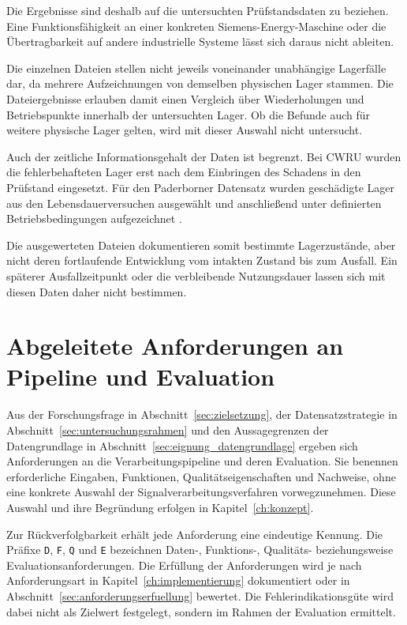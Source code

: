 Die Ergebnisse sind deshalb auf die untersuchten Prüfstandsdaten zu beziehen.
Eine Funktionsfähigkeit an einer konkreten Siemens-Energy-Maschine oder die
Übertragbarkeit auf andere industrielle Systeme lässt sich daraus nicht
ableiten.

Die einzelnen Dateien stellen nicht jeweils voneinander unabhängige
Lagerfälle dar, da mehrere Aufzeichnungen von demselben physischen Lager
stammen. Die Dateiergebnisse erlauben damit einen Vergleich über
Wiederholungen und Betriebspunkte innerhalb der untersuchten Lager. Ob die
Befunde auch für weitere physische Lager gelten, wird mit dieser Auswahl
nicht untersucht.

Auch der zeitliche Informationsgehalt der Daten ist begrenzt. Bei CWRU wurden
die fehlerbehafteten Lager erst nach dem Einbringen des Schadens in den
Prüfstand eingesetzt. Für den Paderborner Datensatz wurden geschädigte Lager
aus den Lebensdauerversuchen ausgewählt und anschließend unter definierten
Betriebsbedingungen aufgezeichnet
\cite[S.~102, Abschn.~3.1]{smithRollingElementBearing2015}
\cite[S.~5--8, Abschn.~3--4.2]
{lessmeierConditionMonitoringBearing2016}.

Die ausgewerteten Dateien dokumentieren somit bestimmte Lagerzustände, aber
nicht deren fortlaufende Entwicklung vom intakten Zustand bis zum Ausfall.
Ein späterer Ausfallzeitpunkt oder die verbleibende Nutzungsdauer lassen sich
mit diesen Daten daher nicht bestimmen.

\section{Abgeleitete Anforderungen an Pipeline und Evaluation}
\label{sec:anforderungskatalog}

Aus der Forschungsfrage in Abschnitt~\ref{sec:zielsetzung}, der
Datensatzstrategie in Abschnitt~\ref{sec:untersuchungsrahmen} und den
Aussagegrenzen der Datengrundlage in
Abschnitt~\ref{sec:eignung_datengrundlage} ergeben sich Anforderungen
an die Verarbeitungspipeline und deren Evaluation. Sie benennen
erforderliche Eingaben, Funktionen, Qualitätseigenschaften und Nachweise,
ohne eine konkrete Auswahl der Signalverarbeitungsverfahren vorwegzunehmen.
Diese Auswahl und ihre Begründung erfolgen in
Kapitel~\ref{ch:konzept}.

Zur Rückverfolgbarkeit erhält jede Anforderung eine eindeutige Kennung. Die
Präfixe \texttt{D}, \texttt{F}, \texttt{Q} und \texttt{E} bezeichnen Daten-,
Funktions-, Qualitäts- beziehungsweise Evaluationsanforderungen. Die
Erfüllung der Anforderungen wird je nach Anforderungsart in
Kapitel~\ref{ch:implementierung} dokumentiert oder in
Abschnitt~\ref{sec:anforderungserfuellung} bewertet. Die
Fehlerindikationsgüte wird dabei nicht als Zielwert festgelegt, sondern im
Rahmen der Evaluation ermittelt.

